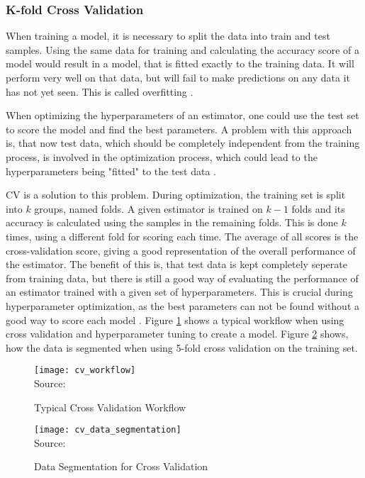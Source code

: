 \subsubsection{K-fold Cross Validation}

When training a model, it is necessary to split the data into train and test samples.
Using the same data for training and calculating the accuracy
score of a model would result in a model, that is fitted exactly to the training
data. It will perform very well on that data, but will fail to make predictions on any data
it has not yet seen. This is called overfitting \cite[7]{Raschka2018}.

When optimizing the hyperparameters of an estimator, one could use the test set to score
the model and find the best parameters. A problem with this approach is, that now test data,
which should be completely independent from the training process,
is involved in the optimization process, which could lead to the hyperparameters being
"fitted" to the test data \cite{scikit-cross-validation}.

\ac{CV} is a solution to this problem. During optimization, the training set is
split into $k$ groups, named folds. A given estimator is trained on $k-1$ folds and its accuracy
is calculated using the samples in the remaining folds. This is done $k$ times, using a different fold
for scoring each time. The average of all scores is the cross-validation score, giving a good
representation of the overall performance of the estimator.
The benefit of this is, that test data is kept completely seperate from training data, but there
is still a good way of evaluating the performance of an estimator trained with a given set
of hyperparameters. This is crucial during hyperparameter optimization, as the best parameters
can not be found without a good way to score each model \cite[24f]{Raschka2018} \cite{scikit-cross-validation}.
Figure \ref{fig:cross validation workflow} shows a typical workflow when using cross validation
and hyperparameter tuning to create a model. Figure \ref{fig:cv data segmentation} shows,
how the data is segmented when using 5-fold cross validation on the training set.

\begin{figure}[H]
    \centering
    \caption{Typical Cross Validation Workflow}
	\label{fig:cross validation workflow}
    \texttt{[image: cv\_workflow]}
    \\
    Source: \cite{scikit-cross-validation}
\end{figure}

\begin{figure}[H]
    \centering
    \caption{Data Segmentation for Cross Validation}
	\label{fig:cv data segmentation}
    \texttt{[image: cv\_data\_segmentation]}
    \\
    Source: \cite{scikit-cross-validation}
\end{figure}